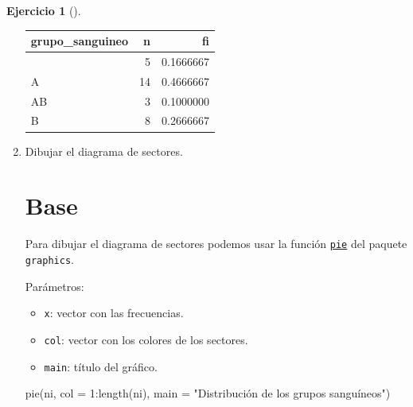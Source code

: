 \documentclass[
  spanish,
  a4paper,
]{scrreport}
\newenvironment{Shaded}{\begin{snugshade}}{\end{snugshade}}
\newcommand{\AttributeTok}[1]{\textcolor[rgb]{0.40,0.45,0.13}{#1}}
\newcommand{\DecValTok}[1]{\textcolor[rgb]{0.68,0.00,0.00}{#1}}
\newcommand{\FunctionTok}[1]{\textcolor[rgb]{0.28,0.35,0.67}{#1}}
\newcommand{\NormalTok}[1]{\textcolor[rgb]{0.00,0.23,0.31}{#1}}
\newcommand{\SpecialCharTok}[1]{\textcolor[rgb]{0.37,0.37,0.37}{#1}}
\newcommand{\StringTok}[1]{\textcolor[rgb]{0.13,0.47,0.30}{#1}}
\providecommand{\tightlist}{%
  \setlength{\itemsep}{0pt}\setlength{\parskip}{0pt}}
\theoremstyle{definition}
\newtheorem{exercise}{Ejercicio}[chapter]
\theoremstyle{remark}
\begin{document}
\begin{exercise}[]
\begin{enumerate}
\begin{tcolorbox}
  \begin{longtable}[]{@{}lrr@{}}
  \toprule\noalign{}
  grupo\_sanguineo & n & fi \\
  \midrule\noalign{}
  \endhead
  \bottomrule\noalign{}
  \endlastfoot
  0 & 5 & 0.1666667 \\
  A & 14 & 0.4666667 \\
  AB & 3 & 0.1000000 \\
  B & 8 & 0.2666667 \\
  \end{longtable}

  \end{tcolorbox}
\item
  Dibujar el diagrama de sectores.

  \begin{tcolorbox}[enhanced jigsaw, breakable, leftrule=.75mm, toptitle=1mm, rightrule=.15mm, opacitybacktitle=0.6, left=2mm, colframe=quarto-callout-tip-color-frame, titlerule=0mm, toprule=.15mm, opacityback=0, bottomtitle=1mm, coltitle=black, colbacktitle=quarto-callout-tip-color!10!white, title=\textcolor{quarto-callout-tip-color}{\faLightbulb}\hspace{0.5em}{Solución}, arc=.35mm, bottomrule=.15mm, colback=white]

  \section{Base}

  Para dibujar el diagrama de sectores podemos usar la función
  \href{https://www.rdocumentation.org/packages/graphics/versions/3.6.2/topics/pie}{\texttt{pie}}
  del paquete \texttt{graphics}.

  Parámetros:

  \begin{itemize}
  \tightlist
  \item
    \texttt{x}: vector con las frecuencias.
  \item
    \texttt{col}: vector con los colores de los sectores.
  \item
    \texttt{main}: título del gráfico.
  \end{itemize}

\begin{Shaded}
\begin{Highlighting}[]
\FunctionTok{pie}\NormalTok{(ni, }\AttributeTok{col =} \DecValTok{1}\SpecialCharTok{:}\FunctionTok{length}\NormalTok{(ni), }\AttributeTok{main =} \StringTok{"Distribución de los grupos sanguíneos"}\NormalTok{)}
\end{Highlighting}
\end{Shaded}


\end{tcolorbox}
\end{enumerate}
\end{exercise}
\end{document}
